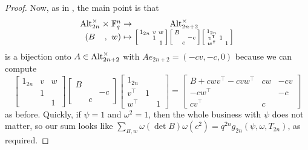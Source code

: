 \begin{proof}
    Now, as in , the main point is that
    \[\arraycolsep=1.4pt\begin{array}{cccccc}
        \Alt_{2n}^\times &\times& \FF_q^n &\to& \Alt_{2n+2}^\times \\
        (B &,& w) &\mapsto& \begin{bsmallmatrix}
            1_{2n} & v & w \\
            & 1 \\ && 1
        \end{bsmallmatrix}\begin{bsmallmatrix}
            B \\ && -c \\ & c
        \end{bsmallmatrix}\begin{bsmallmatrix}
            1_{2n} \\ v^\intercal & 1 \\ w^\intercal && 1
        \end{bsmallmatrix}
    \end{array}\]
    is a bijection onto $A\in\operatorname{Alt}_{2n+2}^\times$ with $Ae_{2n+2}=(-cv,-c,0)$ because we can compute
    \[\begin{bmatrix}
        1_{2n} & v & w \\
        & 1 \\ && 1
    \end{bmatrix}\begin{bmatrix}
        B \\ && -c \\ & c
    \end{bmatrix}\begin{bmatrix}
        1_{2n} \\ v^\intercal & 1 \\ w^\intercal && 1
    \end{bmatrix}=\begin{bmatrix}
        B+cwv^\intercal-cvw^\intercal & cw & -cv \\
        -cw^\intercal && -c \\
        cv^\intercal & c
    \end{bmatrix}\]
    as before. Quickly, if $\psi=1$ and $\omega^2=1$, then the whole business with $\psi$ does not matter, so our sum looks like $\sum_{B,w}\omega(\det B)\omega\left(c^2\right)=q^{2n}g_{2n}(\psi,\omega,T_{2n})$, as required.


\end{proof}
